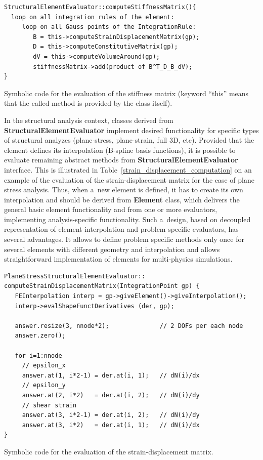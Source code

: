 \documentclass[a4paper]{article}
\newcommand{\class}[1]{{\bf #1}}
\begin{document}
\begin{table}[t]
\footnotesize
\begin{verbatim}
StructuralElementEvaluator::computeStiffnessMatrix(){
  loop on all integration rules of the element:
     loop on all Gauss points of the IntegrationRule:
        B = this->computeStrainDisplacementMatrix(gp);
        D = this->computeConstitutiveMatrix(gp);
        dV = this->computeVolumeAround(gp);
        stiffnessMatrix->add(product of B^T_D_B_dV); 
}
\end{verbatim}
\caption{Symbolic code for the evaluation of the stiffness matrix
	(keyword ``this'' means that the called method is provided by the
	class itself).}
\label{stiffness_computation}
\end{table}

In the structural analysis context, classes derived from
\class{StructuralElementEvaluator} implement desired functionality for
specific types of structural analyzes (plane-stress, plane-strain,
full 3D, etc). Provided that the element defines its interpolation
(B-spline basis functions), it is
possible to evaluate remaining abstract methods from
\class{StructuralElementEvaluator} interface. This is illustrated in
Table~\ref{strain_displacement_computation} on an example of the
evaluation of the strain-displacement matrix for the case of plane
stress analysis. Thus, when a~new element is 
defined, it has to create its own interpolation and should be derived from
\class{Element} class, which delivers the general basic element
functionality and from one or more evaluators, implementing
analysis-specific functionality. Such a~design, based on 
decoupled representation of element interpolation and problem specific
evaluators, has several advantages. It allows to define problem
specific methods only once for several elements with different geometry and
interpolation and allows straightforward implementation of elements
for multi-physics simulations. 

\begin{table}[t]
\footnotesize
\begin{verbatim}
PlaneStressStructuralElementEvaluator::
computeStrainDisplacementMatrix(IntegrationPoint gp) {
   FEInterpolation interp = gp->giveElement()->giveInterpolation();
   interp->evalShapeFunctDerivatives (der, gp);
 
   answer.resize(3, nnode*2);              // 2 DOFs per each node
   answer.zero();
  
   for i=1:nnode
     // epsilon_x
     answer.at(1, i*2-1) = der.at(i, 1);   // dN(i)/dx
     // epsilon_y
     answer.at(2, i*2)   = der.at(i, 2);   // dN(i)/dy
     // shear strain
     answer.at(3, i*2-1) = der.at(i, 2);   // dN(i)/dy
     answer.at(3, i*2)   = der.at(i, 1);   // dN(i)/dx
}
\end{verbatim}
\caption{Symbolic code for the evaluation of the strain-displacement matrix.}
\label{strain_displacement_computation}
\end{table}
\end{document}
